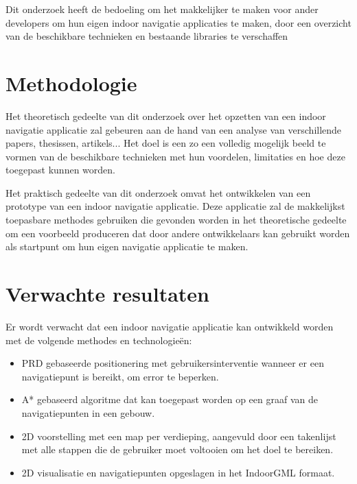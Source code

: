 Dit onderzoek heeft de bedoeling om het makkelijker te maken voor ander developers om hun eigen indoor navigatie applicaties te maken, door een overzicht van de beschikbare technieken en bestaande libraries te verschaffen

\section{Methodologie}
\label{sec:methodologie}
Het theoretisch gedeelte van dit onderzoek over het opzetten van een indoor navigatie applicatie zal gebeuren aan de hand van een analyse van verschillende papers, thesissen, artikels... Het doel is een zo een volledig mogelijk beeld te vormen van de beschikbare technieken met hun voordelen, limitaties en hoe deze toegepast kunnen worden.

Het praktisch gedeelte van dit onderzoek omvat het ontwikkelen van een prototype van een indoor navigatie applicatie. Deze applicatie zal de makkelijkst toepasbare methodes gebruiken die gevonden worden in het theoretische gedeelte om een voorbeeld produceren dat door andere ontwikkelaars kan gebruikt worden als startpunt om hun eigen navigatie applicatie te maken.

\section{Verwachte resultaten}
\label{sec:verwachte_resultaten}
Er wordt verwacht dat een indoor navigatie applicatie kan ontwikkeld worden met de volgende methodes en technologieën:

\begin{itemize}
  \item PRD gebaseerde positionering met gebruikersinterventie wanneer er een navigatiepunt is bereikt, om error te beperken.
  \item A* gebaseerd algoritme dat kan toegepast worden op een graaf van de navigatiepunten in een gebouw.
  \item 2D voorstelling met een map per verdieping, aangevuld door een takenlijst met alle stappen die de gebruiker moet voltooien om het doel te bereiken.
  \item 2D visualisatie en navigatiepunten opgeslagen in het IndoorGML formaat.
\end{itemize}

